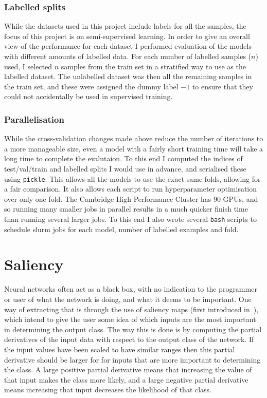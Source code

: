 \subsubsection{Labelled splits}
While the datasets used in this project include labels for all the samples, the focus of this project is on semi-supervised learning.
In order to give an overall view of the performance for each dataset I performed evaluation of the models with different amounts of
labelled data. For each number of labelled samples ($n$) used, I selected $n$ samples from the train set in a stratified way to use as the 
labelled dataset. The unlabelled dataset was then all the remaining samples in the train set, and these were assigned the dummy label $-1$ to 
ensure that they could not accidentally be used in supervised training.

\subsubsection{Parallelisation}
While the cross-validation changes made above reduce the number of iterations to a more manageable size, even a model with a fairly short 
training time will take a long time to complete the evalutaion. To this end I computed the indices of test/val/train and labelled 
splits I would use in advance, and serialised these using \texttt{pickle}. This allows all the models to use the exact same folds, allowing
for a fair comparison. It also allows each script to run hyperparameter optimisation over only one fold. The Cambridge High Performance
Cluster has 90 GPUs, and so running many smaller jobs in parallel results in a much quicker finish time than running several larger jobs.
To this end I also wrote several \texttt{bash} scripts to schedule slurm jobs for each model, number of labelled examples and fold. 

\section{Saliency}
Neural networks often act as a black box, with no indication to the programmer or user of what the network is doing, and what it deems 
to be important. One way of extracting that is through the use of saliency maps (first introduced in~\cite{DBLP:journals/corr/SimonyanVZ13}), 
which intend to give the user some idea of which inputs 
are the most important in determining the output class. The way this is done is by computing the partial derivatives of the input data 
with respect to the output class of the network. If the input values have been scaled to have similar ranges then this partial derivative
should be larger for for inputs that are more important to determining the class. A large positive partial derivative means that increasing 
the value of that input makes the class more likely, and a large negative partial derivative means increasing that input decreases the 
likelihood of that class.

